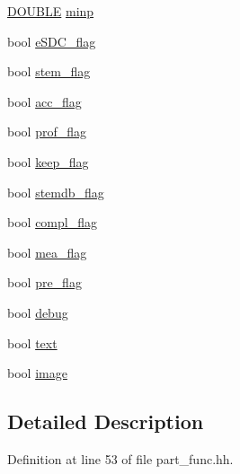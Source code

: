 \begin{DoxyCompactItemize}
\item 
\hyperlink{energy__const_8hh_a8747af38b86aa2bbcda2f1b1aa0888c2}{D\+O\+U\+B\+L\+E} \hyperlink{class_rfold_1_1_arg_a4ea3681597506bb5d8b10e2cda9a3ca6}{minp}
\item 
bool \hyperlink{class_rfold_1_1_arg_addf5237deb4bf9025fa747fbd2c33366}{e\+S\+D\+C\+\_\+flag}
\item 
bool \hyperlink{class_rfold_1_1_arg_aa67a67820097b91b6376581ae28ee481}{stem\+\_\+flag}
\item 
bool \hyperlink{class_rfold_1_1_arg_aaffa31cee9aee99818d1629270d2516a}{acc\+\_\+flag}
\item 
bool \hyperlink{class_rfold_1_1_arg_ada0e4aafdcedc01f9891d523f2626226}{prof\+\_\+flag}
\item 
bool \hyperlink{class_rfold_1_1_arg_ab606ce2fd660a90d7af0f1d5773ffd57}{keep\+\_\+flag}
\item 
bool \hyperlink{class_rfold_1_1_arg_ad5d34ff788f8795f1e75f313dd67c79e}{stemdb\+\_\+flag}
\item 
bool \hyperlink{class_rfold_1_1_arg_a14c91eff857985c1c3eeac20dac4d092}{compl\+\_\+flag}
\item 
bool \hyperlink{class_rfold_1_1_arg_a7b3d1a355bec84586c9832c1858a2f6b}{mea\+\_\+flag}
\item 
bool \hyperlink{class_rfold_1_1_arg_a8a7ca4df7e6085e8cc4af60917c99a92}{pre\+\_\+flag}
\item 
bool \hyperlink{class_rfold_1_1_arg_ad6f2d65fd94879a530699ee4680e5d63}{debug}
\item 
bool \hyperlink{class_rfold_1_1_arg_ad174f7be713784b338a8e3423c950dac}{text}
\item 
bool \hyperlink{class_rfold_1_1_arg_ab7df3ff6900da414d534707f37d87c2d}{image}
\end{DoxyCompactItemize}


\subsection{Detailed Description}


Definition at line 53 of file part\+\_\+func.\+hh.



